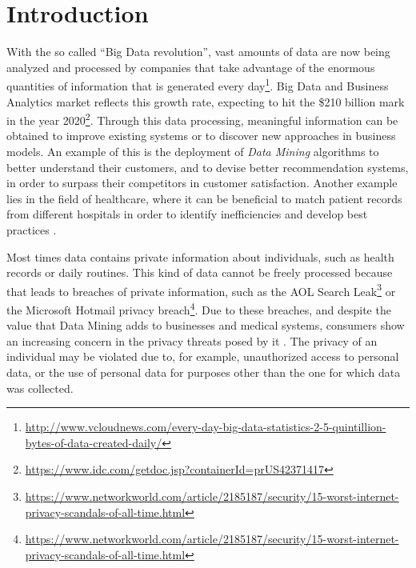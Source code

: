 %

\acresetall

\chapter{Introduction}
\label{ch:Introduction}



With the so called ``Big Data revolution'', vast amounts of data are now being analyzed and processed by companies that take advantage of the enormous quantities of information that is generated every day\footnote{\url{http://www.vcloudnews.com/every-day-big-data-statistics-2-5-quintillion-bytes-of-data-created-daily/}}. Big Data and Business Analytics market reflects this growth rate, expecting to hit the \$210 billion mark in the year 2020\footnote{\url{https://www.idc.com/getdoc.jsp?containerId=prUS42371417}}.
Through this data processing, meaningful information can be obtained to improve existing systems or to discover new approaches in business models. An example of this is the deployment of \textit{Data Mining} algorithms to better understand their customers, and to devise better recommendation systems, in order to surpass their competitors in customer satisfaction. Another example lies in the field of healthcare, where it can be beneficial to match patient records from different hospitals in order to identify inefficiencies and develop best practices \cite{Lu2014}. 

Most times data contains private information about individuals, such as health records or daily routines. This kind of data cannot be freely processed because that leads to breaches of private information, such as the AOL Search Leak\footnote{\url{https://www.networkworld.com/article/2185187/security/15-worst-internet-privacy-scandals-of-all-time.html}} or the Microsoft Hotmail privacy breach\footnote{\url{https://www.networkworld.com/article/2185187/security/15-worst-internet-privacy-scandals-of-all-time.html}}. Due to these breaches, and despite the value that Data Mining adds to businesses and medical systems, consumers show an increasing concern in the privacy threats posed by it \cite{brankovic1999privacy}. The privacy of an individual may be violated due to, for example, unauthorized access to personal data, or the use of personal data for purposes other than the one for which data was collected.

